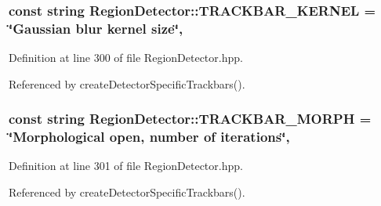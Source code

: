 \hypertarget{classmultiscale_1_1analysis_1_1RegionDetector_a79b72da59c92b368fb7894fe1f424e00}{
\subsubsection[{T\-R\-A\-C\-K\-B\-A\-R\-\_\-\-K\-E\-R\-N\-E\-L}]{\setlength{\rightskip}{0pt plus 5cm}const string Region\-Detector\-::\-T\-R\-A\-C\-K\-B\-A\-R\-\_\-\-K\-E\-R\-N\-E\-L = \char`\"{}Gaussian blur kernel size\char`\"{}\hspace{0.3cm}{\ttfamily [static]}, {\ttfamily [private]}}}\label{classmultiscale_1_1analysis_1_1RegionDetector_a79b72da59c92b368fb7894fe1f424e00}


Definition at line 300 of file Region\-Detector.\-hpp.



Referenced by create\-Detector\-Specific\-Trackbars().

\hypertarget{classmultiscale_1_1analysis_1_1RegionDetector_a0358affd40f13327b10447b7fe938338}{
\subsubsection[{T\-R\-A\-C\-K\-B\-A\-R\-\_\-\-M\-O\-R\-P\-H}]{\setlength{\rightskip}{0pt plus 5cm}const string Region\-Detector\-::\-T\-R\-A\-C\-K\-B\-A\-R\-\_\-\-M\-O\-R\-P\-H = \char`\"{}Morphological open, number of iterations\char`\"{}\hspace{0.3cm}{\ttfamily [static]}, {\ttfamily [private]}}}\label{classmultiscale_1_1analysis_1_1RegionDetector_a0358affd40f13327b10447b7fe938338}


Definition at line 301 of file Region\-Detector.\-hpp.



Referenced by create\-Detector\-Specific\-Trackbars().

